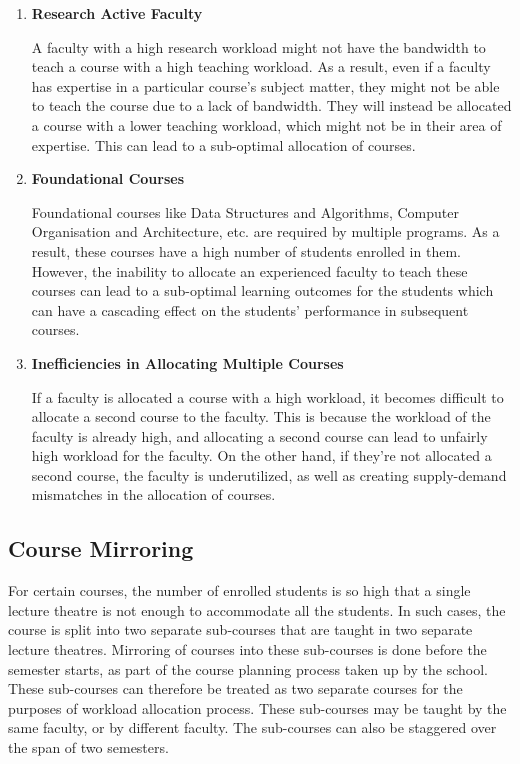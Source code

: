 \begin{enumerate}

  \item \textbf{Research Active Faculty}

        A faculty with a high research workload might not have the bandwidth to teach a course with a high teaching workload. As a result, even if a faculty has expertise in a particular course's subject matter, they might not be able to teach the course due to a lack of bandwidth. They will instead be allocated a course with a lower teaching workload, which might not be in their area of expertise. This can lead to a sub-optimal allocation of courses.

  \item \textbf{Foundational Courses}

        Foundational courses like Data Structures and Algorithms, Computer Organisation and Architecture, etc. are required by multiple programs. As a result, these courses have a high number of students enrolled in them. However, the inability to allocate an experienced faculty to teach these courses can lead to a sub-optimal learning outcomes for the students which can have a cascading effect on the students' performance in subsequent courses.

  \item \textbf{Inefficiencies in Allocating Multiple Courses}

        If a faculty is allocated a course with a high workload, it becomes difficult to allocate a second course to the faculty. This is because the workload of the faculty is already high, and allocating a second course can lead to unfairly high workload for the faculty. On the other hand, if they're not allocated a second course, the faculty is underutilized, as well as creating supply-demand mismatches in the allocation of courses.

\end{enumerate}

\subsection{Course Mirroring}

For certain courses, the number of enrolled students is so high that a single lecture theatre is not enough to accommodate all the students. In such cases, the course is split into two separate sub-courses that are taught in two separate lecture theatres. Mirroring of courses into these sub-courses is done before the semester starts, as part of the course planning process taken up by the school. These sub-courses can therefore be treated as two separate courses for the purposes of workload allocation process.  These sub-courses may be taught by the same faculty, or by different faculty. The sub-courses can also be staggered over the span of two semesters.


